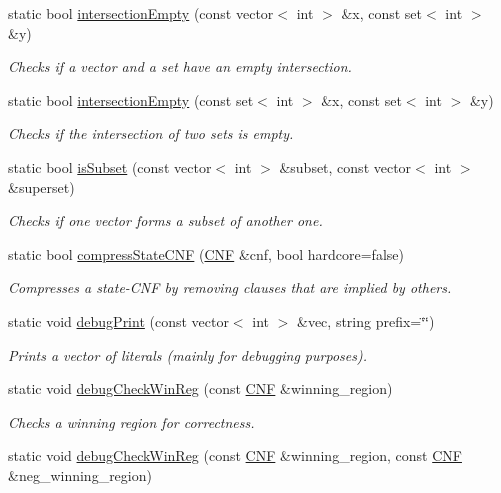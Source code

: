\begin{DoxyCompactItemize}
static bool \hyperlink{classUtils_aa6a513b0ad3b22b3b857060219c222d6}{intersection\-Empty} (const vector$<$ int $>$ \&x, const set$<$ int $>$ \&y)
\begin{DoxyCompactList}\small\item\em Checks if a vector and a set have an empty intersection. \end{DoxyCompactList}\item 
static bool \hyperlink{classUtils_ae957d76f82e729f9d127cf05cb61320d}{intersection\-Empty} (const set$<$ int $>$ \&x, const set$<$ int $>$ \&y)
\begin{DoxyCompactList}\small\item\em Checks if the intersection of two sets is empty. \end{DoxyCompactList}\item 
static bool \hyperlink{classUtils_ab5dca8125b6addaa1f0331664ab6142e}{is\-Subset} (const vector$<$ int $>$ \&subset, const vector$<$ int $>$ \&superset)
\begin{DoxyCompactList}\small\item\em Checks if one vector forms a subset of another one. \end{DoxyCompactList}\item 
static bool \hyperlink{classUtils_ac4e713aa386834b587e2695855fbc27a}{compress\-State\-C\-N\-F} (\hyperlink{classCNF}{C\-N\-F} \&cnf, bool hardcore=false)
\begin{DoxyCompactList}\small\item\em Compresses a state-\/\-C\-N\-F by removing clauses that are implied by others. \end{DoxyCompactList}\item 
static void \hyperlink{classUtils_adeaccd2a53073b17e3409eab8e98db0c}{debug\-Print} (const vector$<$ int $>$ \&vec, string prefix=\char`\"{}\char`\"{})
\begin{DoxyCompactList}\small\item\em Prints a vector of literals (mainly for debugging purposes). \end{DoxyCompactList}\item 
static void \hyperlink{classUtils_acc29602987b73022546a6d752a7e093f}{debug\-Check\-Win\-Reg} (const \hyperlink{classCNF}{C\-N\-F} \&winning\-\_\-region)
\begin{DoxyCompactList}\small\item\em Checks a winning region for correctness. \end{DoxyCompactList}\item 
static void \hyperlink{classUtils_a448f5356530d2e88fa9928f4ed857238}{debug\-Check\-Win\-Reg} (const \hyperlink{classCNF}{C\-N\-F} \&winning\-\_\-region, const \hyperlink{classCNF}{C\-N\-F} \&neg\-\_\-winning\-\_\-region)

\end{DoxyCompactItemize}
